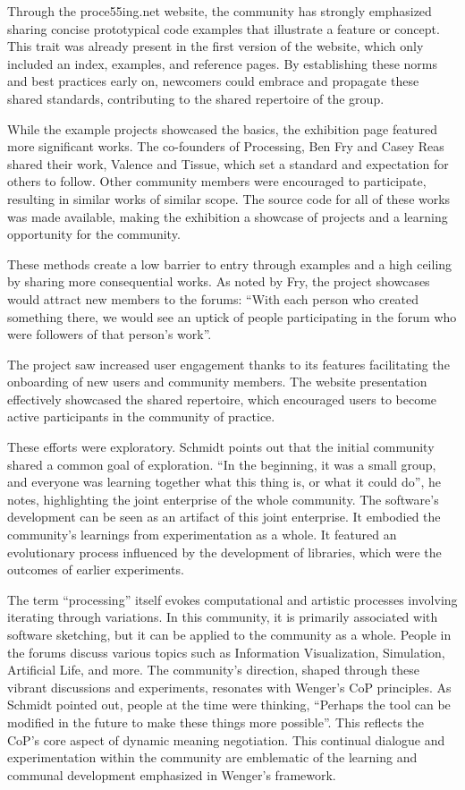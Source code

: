 Through the proce55ing.net website, the community has strongly emphasized sharing concise prototypical code examples that illustrate a feature or concept. This trait was already present in the first version of the website, which only included an index, examples, and reference pages. By establishing these norms and best practices early on, newcomers could embrace and propagate these shared standards, contributing to the shared repertoire of the group. 

While the example projects showcased the basics, the exhibition page featured more significant works. The co-founders of Processing, Ben Fry and Casey Reas shared their work, Valence and Tissue, which set a standard and expectation for others to follow. Other community members were encouraged to participate, resulting in similar works of similar scope. The source code for all of these works was made available, making the exhibition a showcase of projects and a learning opportunity for the community.

These methods create a low barrier to entry through examples and a high ceiling by sharing more consequential works. As noted by Fry, the project showcases would attract new members to the forums: \enquote{With each person who created something there, we would see an uptick of people participating in the forum who were followers of that person’s work}.

The project saw increased user engagement thanks to its features facilitating the onboarding of new users and community members. The website presentation effectively showcased the shared repertoire, which encouraged users to become active participants in the community of practice.

These efforts were exploratory. Schmidt points out that the initial community shared a common goal of exploration. \enquote{In the beginning, it was a small group, and everyone was learning together what this thing is, or what it could do}, he notes, highlighting the joint enterprise of the whole community. The software’s development can be seen as an artifact of this joint enterprise. It embodied the community’s learnings from experimentation as a whole. It featured an evolutionary process influenced by the development of libraries, which were the outcomes of earlier experiments.

The term \enquote{processing} itself evokes computational and artistic processes involving iterating through variations. In this community, it is primarily associated with software sketching, but it can be applied to the community as a whole. People in the forums discuss various topics such as Information Visualization, Simulation, Artificial Life, and more. 
The community’s direction, shaped through these vibrant discussions and experiments, resonates with Wenger’s CoP principles. As Schmidt pointed out, people at the time were thinking, \enquote{Perhaps the tool can be modified in the future to make these things more possible}. This reflects the CoP’s core aspect of dynamic meaning negotiation. This continual dialogue and experimentation within the community are emblematic of the learning and communal development emphasized in Wenger’s framework.

